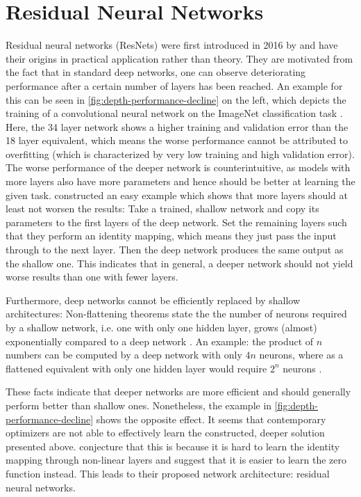 \section{Residual Neural Networks}
\label{sec:neural-networks}

Residual neural networks (ResNets) were first introduced in 2016 by \citet{he16} and have their origins in practical application rather than theory.
They are motivated from the fact that in standard deep networks, one can observe deteriorating performance after a certain number of layers has been reached.
An example for this can be seen in \cref{fig:depth-performance-decline} on the left, which depicts the training of a convolutional neural network on the ImageNet classification task \cite{deng09}.
Here, the 34 layer network shows a higher training and validation error than the 18 layer equivalent, which means the worse performance cannot be attributed to overfitting (which is characterized by very low training and high validation error). 
The worse performance of the deeper network is counterintuitive, as models with more layers also have more parameters and hence should be better at learning the given task.
\citet{he16} constructed an easy example which shows that more layers should at least not worsen the results:
Take a trained, shallow network and copy its parameters to the first layers of the deep network.
Set the remaining layers such that they perform an identity mapping, which means they just pass the input through to the next layer.
Then the deep network produces the same output as the shallow one.
This indicates that in general, a deeper network should not yield worse results than one with fewer layers.

Furthermore, deep networks cannot be efficiently replaced by shallow architectures:
Non-flattening theorems state the the number of neurons required by a shallow network, i.e. one with only one hidden layer, grows (almost) exponentially compared to a deep network \cite{lin17,delalleau11}.
An example: the product of $n$ numbers can be computed by a deep network with only $4n$ neurons, where as a flattened equivalent with only one hidden layer would require $2^n$ neurons \cite{lin17}.



These facts indicate that deeper networks are more efficient and should generally perform better than shallow ones.
Nonetheless, the example in \cref{fig:depth-performance-decline} shows the opposite effect.
It seems that contemporary optimizers are not able to effectively learn the constructed, deeper solution presented above.
\citet{he16} conjecture that this is because it is hard to learn the identity mapping through non-linear layers and suggest that it is easier to learn the zero function instead.
This leads to their proposed network architecture: residual neural networks.

